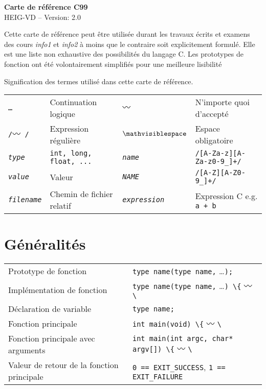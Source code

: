 \documentclass{article}
\newcommand{\type}{\emph{type}}
\newcommand{\name}{\emph{name}}
\newcommand{\val}{\emph{value}}
\newcommand{\NAME}{\emph{NAME}}
\newcommand{\file}{\emph{filename}}
\newcommand{\expr}{\emph{expression}}
\newcommand{\etc}{\small \ldots}
\newcommand{\any}{$\hzigzag$ }
\newcommand{\spc}{$\mathvisiblespace$}
\newcommand{\cd}{\lstinline}
\begin{document}
\setlength{\columnseprule}{0.4pt}

\begin{multicols*}{3}
\begin{center}
{\Large \bf Carte de référence C99}\\
HEIG-VD -- Version: 2.0\\
\end{center}

Cette carte de référence peut être utilisée durant les travaux écrits et examens
des cours \emph{info1} et \emph{info2} à moins que le contraire soit explicitement formulé.
Elle est une liste non exhaustive des possibilités du langage C.
Les prototypes de fonction ont été volontairement simplifiés pour une meilleure lisibilité

Signification des termes utilisé dans cette carte de référence.

\begin{tabularx}{\linewidth}{
  >{\hsize=0.5\hsize}X%
  >{\hsize=1.5\hsize}X%
  >{\hsize=0.5\hsize}X%
  >{\hsize=1.5\hsize}X%
  }

  \tt \etc    & Continuation logique    & \tt \any    & N'importe quoi d'accepté \\
  \tt /\any/  & Expression régulière    & \tt \spc    & Espace obligatoire \\
  \tt \type   & \tt int, long, float, ... & \tt \name   & \tt /[A-Za-z][A-Za-z0-9\_]+/ \\
  \tt \val    & Valeur & \tt \NAME   & \tt /[A-Z][A-Z0-9\_]+/ \\
  \tt \file   & Chemin de fichier relatif & \tt \expr   & Expression C e.g. \tt a + b \\
\end{tabularx}

\section*{Généralités}
\begin{tabularx}{\linewidth}{lX}
  Prototype de fonction               & \cd{type name(type name,} \etc \cd{);} \\
  Implémentation de fonction         & \cd{type name(type name,} \etc \cd{) \{} \any \cd{\}} \\
  Déclaration de variable            & \cd{type name;} \\
  Fonction principale                & \cd{int main(void) \{} \any \cd{\}} \\
  Fonction principale avec arguments & \cd{int main(int argc, char* argv[]) \{} \any \cd{\}} \\
  Valeur de retour de la fonction principale & \cd{0 == EXIT_SUCCESS}, \cd{1 == EXIT_FAILURE}\\
\end{tabularx}


\end{multicols*}
\end{document}
